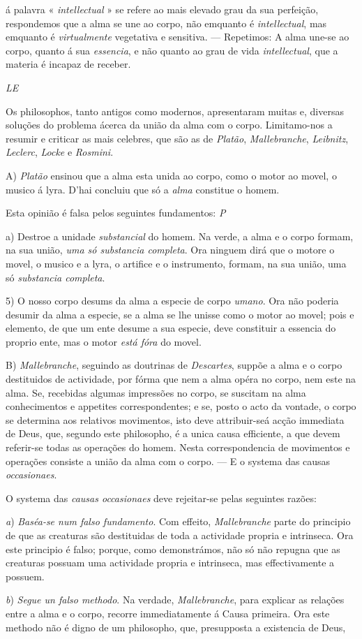 á palavra « \emph{intellectual} » se refere ao mais elevado grau da sua perfeição, respondemos que a alma se une ao corpo, não emquanto é \emph{intellectual}, mas emquanto é \emph{virtualmente} vegetativa e sensitiva. --- Repetimos: A alma une-se ao corpo, quanto á sua \emph{essencia}, e não quanto ao grau de vida \emph{intellectual}, que a materia é incapaz de receber.\par \emph{LE}\par *\par Os philosophos, tanto antigos como modernos, apresentaram muitas e, diversas soluções do problema ácerca da união da alma com o corpo. Limitamo-nos a resumir e criticar as mais celebres, que são as de \emph{Platão}, \emph{Mallebranche}, \emph{Leibnitz}, \emph{Leclerc}, \emph{Locke} e \emph{Rosmini}.\par A) \emph{Platão} ensinou que a alma esta unida ao corpo, como o motor ao movel, o musico á lyra. D'hai concluiu que só a \emph{alma} constitue o homem.\par Esta opinião é falsa pelos seguintes fundamentos: \emph{P}\par a) Destroe a unidade \emph{substancial} do homem. Na verde, a alma e o corpo formam, na sua união, \emph{uma só substancia completa}. Ora ninguem dirá que o motore o movel, o musico e a lyra, o artifice e o instrumento, formam, na sua união, uma só \emph{substancia completa}.\par 5) O nosso corpo desums da alma a especie de corpo \emph{umano}. Ora não poderia desumir da alma a especie, se a alma se lhe unisse como o motor ao movel; pois e elemento, de que um ente desume a sua especie, deve constituir a essencia do proprio ente, mas o motor \emph{está fóra} do movel.\par B) \emph{Mallebranche}, seguindo as doutrinas de \emph{Descartes}, suppõe a alma e o corpo destituidos de actividade, por fórma que nem a alma opéra no corpo, nem este na alma. Se, recebidas algumas impressões no corpo, se suscitam na alma conhecimentos e appetites correspondentes; e se, posto o acto da vontade, o corpo se determina aos relativos movimentos, isto deve attribuir-seá acção immediata de Deus, que, segundo este philosopho, é a unica causa efficiente, a que devem referir-se todas as operações do homem. Nesta correspondencia de movimentos e operações consiste a união da alma com o corpo. --- E o systema das causas \emph{occasionaes}.\par O systema das \emph{causas occasionaes} deve rejeitar-se pelas seguintes razões:\par \emph{a}) \emph{Baséa-se num falso fundamento}. Com effeito, \emph{Mallebranche} parte do principio de que as creaturas são destituidas de toda a actividade propria e intrinseca. Ora este principio é falso; porque, como demonstrámos, não só não repugna que as creaturas possuam uma actividade propria e intrinseca, mas effectivamente a possuem.\par \emph{b}) \emph{Segue un falso methodo}. Na verdade, \emph{Mallebranche}, para explicar as relações entre a alma e o corpo, recorre immediatamente á Causa primeira. Ora este methodo não é digno de um philosopho, que, presupposta a existencia de Deus, 